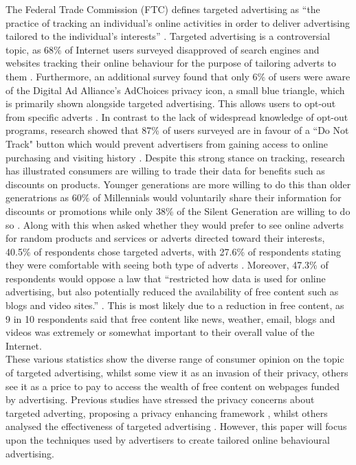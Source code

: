 \documentclass[12pt]{article}
\begin{document}
The Federal Trade Commission (FTC) defines targeted advertising as ``the practice of tracking an individual’s online activities in order to deliver advertising tailored to the individual’s interests'' \parencite{comission2009}. Targeted advertising is a controversial topic, as 68\% of Internet users surveyed disapproved of search engines and websites tracking their online behaviour for the purpose of tailoring adverts to them \parencite{usersTA}. Furthermore, an additional survey found that only 6\% of users were aware of the Digital Ad Alliance's AdChoices privacy icon, a small blue triangle, which is primarily shown alongside targeted advertising. This allows users to opt-out from specific adverts \parencite{AdChoices}. In contrast to the lack of widespread knowledge of opt-out programs, research showed that 87\% of users surveyed are in favour of a ``Do Not Track" button which would prevent advertisers from gaining access to online purchasing and visiting history \parencite{dnt87}. Despite this strong stance on tracking, research has illustrated consumers are willing to trade their data for benefits such as discounts on products. Younger generations are more willing to do this than older generatrions as 60\% of Millennials would voluntarily share their information for discounts or promotions while only 38\% of the Silent Generation are willing to do so \parencite{dnt87}. Along with this when asked whether they would prefer to see online adverts for random products and services or adverts directed toward their interests, 40.5\% of respondents chose targeted adverts, with 27.6\% of respondents stating they were comfortable with seeing both type of adverts \parencite{randomAds}. Moreover, 47.3\% of respondents would oppose a law that ``restricted how data is used for online advertising, but also potentially reduced the availability of free content such as blogs and video sites.” \parencite{randomAds}. This is most likely due to a reduction in free content, as 9 in 10 respondents said that free content like news, weather, email, blogs and videos was extremely or somewhat important to their overall value of the Internet. \\

These various statistics show the diverse range of consumer opinion on the topic of targeted advertising, whilst some view it as an invasion of their privacy, others see it as a price to pay to access the wealth of free content on webpages funded by advertising. Previous studies have stressed the privacy concerns about targeted adverting, proposing a privacy enhancing framework \parencite{wang2015privacy}, whilst others analysed the effectiveness of targeted advertising \parencite{brahim2011targeted}. However, this paper will focus upon the techniques used by  advertisers to create tailored online behavioural advertising. \\
\end{document}
